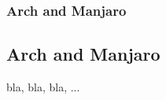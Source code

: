 \begin{frame}
	\frametitle{Arch and Manjaro}
	\subsection{Arch and Manjaro}
	
	bla, bla, bla, ...
\end{frame}
